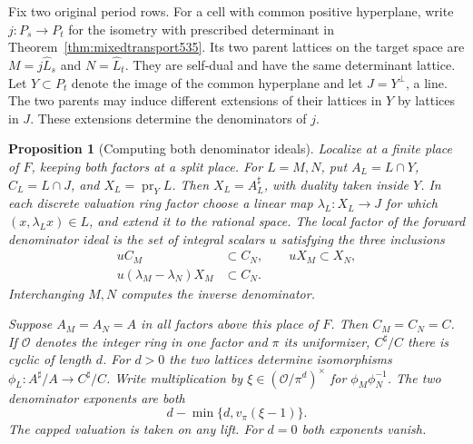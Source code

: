 \documentclass[a4paper,11pt]{article}
\newtheorem{proposition}{Proposition}[section]
\theoremstyle{definition}
\theoremstyle{remark}
\numberwithin{equation}{section}
\begin{document}
Fix two original period rows. For a cell with common positive
hyperplane, write \(j:P_s\to P_t\) for the isometry with prescribed
determinant in Theorem~\ref{thm:mixedtransport535}. Its two parent
lattices on the target space are \(M=j\widehat L_s\) and
\(N=\widehat L_t\). They are self-dual and have the same determinant
lattice. Let \(Y\subset P_t\) denote the image of the common
hyperplane and let \(J=Y^\perp\), a line. The two parents may induce
different extensions of their lattices in \(Y\) by lattices in \(J\).
These extensions determine the denominators of \(j\).

\begin{proposition}[Computing both denominator ideals]
\leavevmode\label{prop:gluing537}
Localize at a finite place of \(F\), keeping both factors at a split
place. For \(L=M,N\), put \(A_L=L\cap Y\), \(C_L=L\cap J\), and
\(X_L=\operatorname{pr}_Y L\). Then \(X_L=A_L^\sharp\), with
duality taken inside \(Y\). In each discrete valuation ring factor
choose a linear map \(\lambda_L:X_L\to J\) for which
\((x,\lambda_L x)\in L\), and extend it to the rational space.
The local factor of the forward denominator ideal is the set of
integral scalars \(u\) satisfying the three inclusions
\[
 \begin{split}
       uC_M&\subset C_N,\qquad uX_M\subset X_N,\\
       u(\lambda_M-\lambda_N)X_M&\subset C_N .
 \end{split}
\]
Interchanging \(M,N\) computes the inverse denominator.

Suppose \(A_M=A_N=A\) in all factors above this place of \(F\).
Then \(C_M=C_N=C\). If \(\mathcal O\) denotes the integer ring
in one factor and \(\pi\) its uniformizer, \(C^\sharp/C\)
there is cyclic of length \(d\). For \(d>0\) the two lattices
determine isomorphisms \(\phi_L:A^\sharp/A\to C^\sharp/C\).
Write multiplication by \(\xi\in(\mathcal O/\pi^d)^\times\)
for \(\phi_M\phi_N^{-1}\). The two denominator exponents are
both
\[
                d-\min\{d,v_\pi(\xi-1)\}.
\]
The capped valuation is taken on any lift. For \(d=0\) both
exponents vanish.
\end{proposition}
\end{document}
